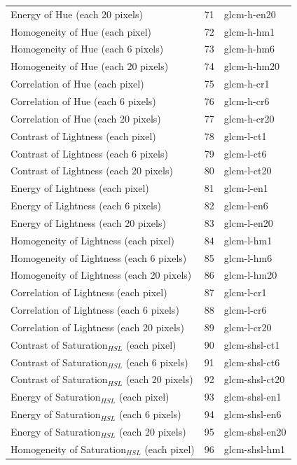\documentclass[11pt,a4paper,draft]{report}
\begin{document}
\begin{center}
\begin{longtable}{|l|c|l|}
Energy of Hue (each 20 pixels) & 71 & glcm-h-en20 \\
Homogeneity of Hue (each pixel) & 72 & glcm-h-hm1 \\
Homogeneity of Hue (each 6 pixels) & 73 & glcm-h-hm6 \\
Homogeneity of Hue (each 20 pixels) & 74 & glcm-h-hm20 \\
Correlation of Hue (each pixel) & 75 & glcm-h-cr1 \\
Correlation of Hue (each 6 pixels) & 76 & glcm-h-cr6 \\
Correlation of Hue (each 20 pixels) & 77 & glcm-h-cr20 \\
Contrast of Lightness (each pixel) & 78 & glcm-l-ct1 \\
Contrast of Lightness (each 6 pixels) & 79 & glcm-l-ct6 \\
Contrast of Lightness (each 20 pixels) & 80 & glcm-l-ct20 \\
Energy of Lightness (each pixel) & 81 & glcm-l-en1 \\
Energy of Lightness (each 6 pixels) & 82 & glcm-l-en6 \\
Energy of Lightness (each 20 pixels) & 83 & glcm-l-en20 \\
Homogeneity of Lightness (each pixel) & 84 & glcm-l-hm1 \\
Homogeneity of Lightness (each 6 pixels) & 85 & glcm-l-hm6 \\
Homogeneity of Lightness (each 20 pixels) & 86 & glcm-l-hm20 \\
Correlation of Lightness (each pixel) & 87 & glcm-l-cr1 \\
Correlation of Lightness (each 6 pixels) & 88 & glcm-l-cr6 \\
Correlation of Lightness (each 20 pixels) & 89 & glcm-l-cr20 \\
Contrast of Saturation$_{HSL}$ (each pixel) & 90 & glcm-shsl-ct1 \\
Contrast of Saturation$_{HSL}$ (each 6 pixels) & 91 & glcm-shsl-ct6 \\
Contrast of Saturation$_{HSL}$ (each 20 pixels) & 92 & glcm-shsl-ct20 \\
Energy of Saturation$_{HSL}$ (each pixel) & 93 & glcm-shsl-en1 \\
Energy of Saturation$_{HSL}$ (each 6 pixels) & 94 & glcm-shsl-en6 \\
Energy of Saturation$_{HSL}$ (each 20 pixels) & 95 & glcm-shsl-en20 \\
Homogeneity of Saturation$_{HSL}$ (each pixel) & 96 & glcm-shsl-hm1 \\

\end{longtable}
\end{center}
\end{document}

